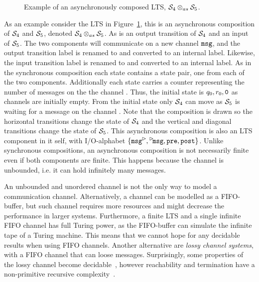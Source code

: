 \begin{figure}[ht]
    \centering
    
    \caption{Example of an asynchronously composed LTS, $\S_4 \async \S_5$.}
    \label{fig:lts-file-acomp}
\end{figure}

As an example consider the LTS in Figure~\ref{fig:lts-file-acomp}, this is an asynchronous composition of $\S_4$ and $\S_5$, denoted $\S_4\async\S_5$. As  is an output transition of $\S_4$ and an input of $\S_5$. The two components will communicate on a new channel $\channel{msg}$, and the output transition label is renamed to  and converted to an internal label. 
Likewise, the input transition label is renamed to  and converted to an internal label. As in the synchronous composition each state contains a state pair, one from each of the two components. Additionally each state carries a counter representing the number of messages on the the channel . Thus, the initial state is $q_0,r_0,\channel{0}$ as channels are initially empty. From the initial state only $\S_4$ can move as $\S_5$ is waiting for a message on the channel . Note that the composition is drawn so the horizontal transitions change the state of $\S_4$ and the vertical and diagonal transitions change the state of $\S_5$. This asynchronous composition is also an LTS component in it self, with I/O-alphabet $\{\transition{\outact{msg}},\transition{\inact{msg}},\transition{pre},\transition{post}\}$. Unlike synchronous compositions, an asynchronous composition is not necessarily finite even if both components are finite. This happens because the channel is unbounded, i.e. it can hold infinitely many messages. 

An unbounded and {unordered} channel is not the only way to model a communication channel. Alternatively, a channel can be modelled as a FIFO-buffer, but such channel requires more resources and might decrease the performance in larger systems. Furthermore, a finite LTS and a single infinite FIFO channel has full Turing power, as the FIFO-buffer can simulate the infinite tape of a Turing machine. This means that we cannot hope for any decidable results when using FIFO channels. Another alternative are \emph{lossy channel systems}, with a FIFO channel that can loose messages. Surprisingly, some properties of the lossy channel become decidable~\cite{Abdulla199691}, however reachability and termination have a non-primitive recursive complexity~\cite{Schnoebelen2002251}. 

